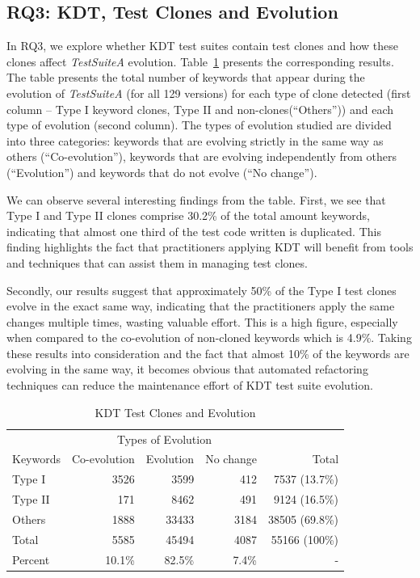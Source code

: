 \subsection{RQ3: KDT, Test Clones and Evolution}
\label{sec:evolution-results-rq3}

In RQ3, we explore whether KDT test suites contain test clones and how these clones affect \emph{TestSuiteA} evolution. Table~\ref{table:co_evolution} presents the corresponding results. The table presents the total number of keywords that appear during the evolution of \emph{TestSuiteA} (for all 129 versions) for each type of clone detected (first column -- Type I keyword clones, Type II and non-clones(``Others'')) and each type of evolution (second column). The types of evolution studied are divided into three categories: keywords that are evolving strictly in the same way as others (``Co-evolution''), keywords that are evolving independently from others (``Evolution'') and keywords that do not evolve (``No change'').

We can observe several interesting findings from the table. First, we see that Type I and Type II clones comprise 30.2\% of the total amount keywords, indicating that almost one third of the test code written is duplicated. This finding highlights the fact that practitioners applying KDT will benefit from tools and techniques that can assist them in managing test clones.

Secondly, our results suggest that approximately 50\% of the Type I test clones evolve in the exact same way, indicating that the practitioners apply the same changes multiple times, wasting valuable effort. This is a high figure, especially when compared to the co-evolution of non-cloned keywords which is 4.9\%. Taking these results into consideration and the fact that almost 10\% of the keywords are evolving in the same way, it becomes obvious that automated refactoring techniques can reduce the maintenance effort of KDT test suite evolution.

\begin{table}
\caption{KDT Test Clones and Evolution}
\label{table:co_evolution}
\centering
\begin{tabular}{l|rrr|r}
  \toprule
         & \multicolumn{3}{c|}{Types of Evolution}                  \\
Keywords & Co-evolution &  Evolution &  No change &  Total          \\
\midrule
Type I  &          3526 &       3599 &        412 &   7537 (13.7\%) \\
Type II &           171 &       8462 &        491 &   9124 (16.5\%) \\  
Others  &          1888 &      33433 &       3184 &  38505 (69.8\%) \\
\midrule                                   
Total   &          5585 &      45494 &       4087 &  55166 (100\%)  \\ 
Percent &        10.1\% &     82.5\% &      7.4\% &    -            \\
\bottomrule
\end{tabular}
\end{table}


